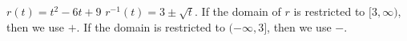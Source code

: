 {$r(t)=t^2-6t+9$}
{$r^{-1}(t)=3\pm\sqrt t$.  If the domain of $r$ is restricted to $[3,\infty)$, then we use $+$.  If the domain is restricted to $(-\infty,3]$, then we use $-$.}
